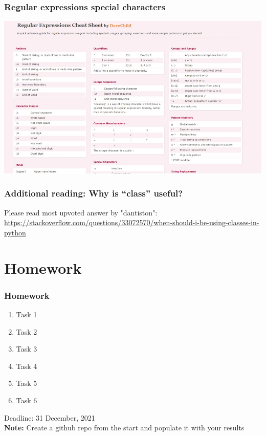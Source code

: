 \documentclass{beamer}
\begin{document}
\begin{frame}
    \frametitle{Regular expressions special characters}
            \centering
            \includegraphics[scale=0.5]{figures/regex.jpg}
\end{frame}

\begin{frame}
    \frametitle{Additional reading: Why is “class” useful?}
    Please read most upvoted answer by "dantiston":
     \url{https://stackoverflow.com/questions/33072570/when-should-i-be-using-classes-in-python} 
\end{frame}

\section{Homework} 

\begin{frame}
    \frametitle{Homework}
    \begin{enumerate}
        \item Task 1
        \item Task 2
        \item Task 3
        \item Task 4
        \item Task 5
        \item Task 6
    \end{enumerate}

\vskip 2mm
Deadline: 31 December, 2021 \\

\vfill
\textbf{Note:} Create a github repo from the start and populate it with your results
\end{frame}
\end{document}
